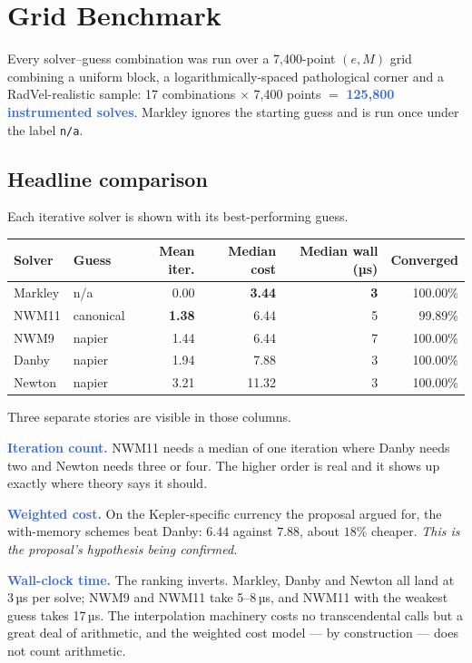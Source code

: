 \documentclass[11pt,a4paper]{article}
\newcommand{\key}[1]{\textcolor{Highlight}{\bfseries #1}}
\begin{document}
\section{Grid Benchmark}
\label{sec:grid}

Every solver--guess combination was run over a 7{,}400-point $(e,M)$ grid
combining a uniform block, a logarithmically-spaced pathological corner
and a RadVel-realistic sample: 17 combinations $\times$ 7{,}400 points
$=$ \key{125{,}800 instrumented solves}. Markley ignores the starting
guess and is run once under the label \texttt{n/a}.

\subsection{Headline comparison}

Each iterative solver is shown with its best-performing guess.

\begin{center}
\small
\begin{tabular}{@{}llrrrr@{}}
\toprule
\textbf{Solver} & \textbf{Guess} & \textbf{Mean iter.} & \textbf{Median cost} & \textbf{Median wall (µs)} & \textbf{Converged} \\
\midrule
Markley & n/a       & 0.00 & \textbf{3.44} & \textbf{3} & 100.00\% \\
NWM11   & canonical & \textbf{1.38} & 6.44 & 5 & 99.89\% \\
NWM9    & napier    & 1.44 & 6.44 & 7 & 100.00\% \\
Danby   & napier    & 1.94 & 7.88 & 3 & 100.00\% \\
Newton  & napier    & 3.21 & 11.32 & 3 & 100.00\% \\
\bottomrule
\end{tabular}
\end{center}

Three separate stories are visible in those columns.

\key{Iteration count.} NWM11 needs a median of one iteration where Danby
needs two and Newton needs three or four. The higher order is real and it
shows up exactly where theory says it should.

\key{Weighted cost.} On the Kepler-specific currency the proposal argued
for, the with-memory schemes beat Danby: $6.44$ against $7.88$, about
$18\%$ cheaper. \emph{This is the proposal's hypothesis being confirmed.}

\key{Wall-clock time.} The ranking inverts. Markley, Danby and Newton all
land at 3\,µs per solve; NWM9 and NWM11 take 5--8\,µs, and NWM11 with the
weakest guess takes 17\,µs. The interpolation machinery costs no
transcendental calls but a great deal of arithmetic, and the weighted cost
model --- by construction --- does not count arithmetic.
\end{document}
